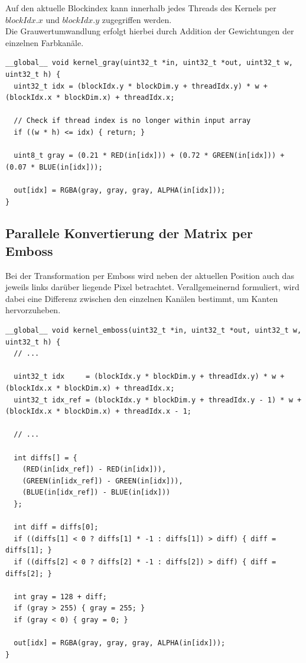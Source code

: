 \documentclass{llncs}
\begin{document}
Auf den aktuelle Blockindex kann innerhalb jedes Threads des Kernels per $blockIdx.x$ und $blockIdx.y$ zugegriffen werden.\\
Die Grauwertumwandlung erfolgt hierbei durch Addition der Gewichtungen der einzelnen Farbkanäle. 

\begin{lstlisting}
__global__ void kernel_gray(uint32_t *in, uint32_t *out, uint32_t w, uint32_t h) {
  uint32_t idx = (blockIdx.y * blockDim.y + threadIdx.y) * w + (blockIdx.x * blockDim.x) + threadIdx.x;

  // Check if thread index is no longer within input array
  if ((w * h) <= idx) { return; }

  uint8_t gray = (0.21 * RED(in[idx])) + (0.72 * GREEN(in[idx])) + (0.07 * BLUE(in[idx]));

  out[idx] = RGBA(gray, gray, gray, ALPHA(in[idx]));
}
\end{lstlisting}

%
\subsection{Parallele Konvertierung der Matrix per Emboss}
%

Bei der Transformation per Emboss wird neben der aktuellen Position auch das jeweils links darüber liegende Pixel betrachtet. Verallgemeinernd formuliert, wird dabei eine Differenz zwischen den einzelnen Kanälen bestimmt, um Kanten hervorzuheben.

\begin{lstlisting}
__global__ void kernel_emboss(uint32_t *in, uint32_t *out, uint32_t w, uint32_t h) {
  // ...
  
  uint32_t idx     = (blockIdx.y * blockDim.y + threadIdx.y) * w + (blockIdx.x * blockDim.x) + threadIdx.x;
  uint32_t idx_ref = (blockIdx.y * blockDim.y + threadIdx.y - 1) * w + (blockIdx.x * blockDim.x) + threadIdx.x - 1;

  // ...

  int diffs[] = {
    (RED(in[idx_ref]) - RED(in[idx])),
    (GREEN(in[idx_ref]) - GREEN(in[idx])),
    (BLUE(in[idx_ref]) - BLUE(in[idx]))
  };

  int diff = diffs[0];
  if ((diffs[1] < 0 ? diffs[1] * -1 : diffs[1]) > diff) { diff = diffs[1]; }
  if ((diffs[2] < 0 ? diffs[2] * -1 : diffs[2]) > diff) { diff = diffs[2]; }

  int gray = 128 + diff;
  if (gray > 255) { gray = 255; }
  if (gray < 0) { gray = 0; }

  out[idx] = RGBA(gray, gray, gray, ALPHA(in[idx]));
}
\end{lstlisting}
%
\end{document}
